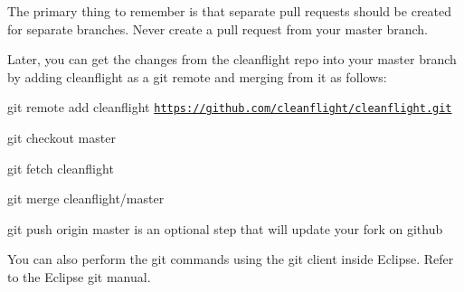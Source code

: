 The primary thing to remember is that separate pull requests should be created for separate branches. Never create a pull request from your {\ttfamily master} branch.

Later, you can get the changes from the cleanflight repo into your {\ttfamily master} branch by adding cleanflight as a git remote and merging from it as follows\+:


\begin{DoxyEnumerate}
\item {\ttfamily git remote add cleanflight \href{https://github.com/cleanflight/cleanflight.git}{\tt https\+://github.\+com/cleanflight/cleanflight.\+git}}
\item {\ttfamily git checkout master}
\item {\ttfamily git fetch cleanflight}
\item {\ttfamily git merge cleanflight/master}
\item {\ttfamily git push origin master} is an optional step that will update your fork on github
\end{DoxyEnumerate}

You can also perform the git commands using the git client inside Eclipse. Refer to the Eclipse git manual. 